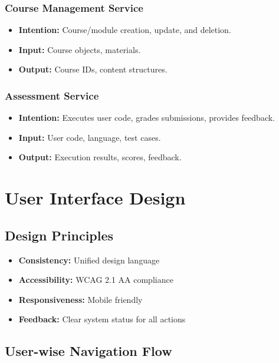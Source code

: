\documentclass[a4paper, 11pt]{scrreprt}
\begin{document}
\subsection{Course Management Service}
\begin{itemize}
    \item \textbf{Intention:} Course/module creation, update, and deletion.
    \item \textbf{Input:} Course objects, materials.
    \item \textbf{Output:} Course IDs, content structures.
\end{itemize}

\subsection{Assessment Service}
\begin{itemize}
    \item \textbf{Intention:} Executes user code, grades submissions, provides feedback.
    \item \textbf{Input:} User code, language, test cases.
    \item \textbf{Output:} Execution results, scores, feedback.
\end{itemize}


\chapter{User Interface Design}

\section{Design Principles}
\begin{itemize}
    \item \textbf{Consistency:} Unified design language
    \item \textbf{Accessibility:} WCAG 2.1 AA compliance
    \item \textbf{Responsiveness:} Mobile friendly
    \item \textbf{Feedback:} Clear system status for all actions
\end{itemize}

\section{User-wise Navigation Flow}
\end{document}
